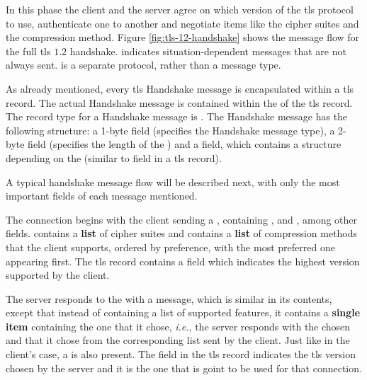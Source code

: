 \documentclass{llncs}
\begin{document}
In this phase the client and the server agree on which version of the \gls{tls}
protocol to use, authenticate one to another and negotiate items like
the cipher suites and the compression method. Figure \ref{fig:tls-12-handshake} shows the message flow for the
full \gls{tls} $1.2$ handshake. \codeword{*} indicates situation-dependent
messages that are not always sent.  is a separate
protocol, rather than a message type.

As already mentioned, every \gls{tls} Handshake message is encapsulated within
a \gls{tls} record. The actual Handshake message is contained within the
 of the \gls{tls} record. The record type for a Handshake
message is . The Handshake message has the following structure:
a 1-byte  field (specifies the Handshake message type),
a 2-byte  field (specifies the length of the )
and a  field, which contains a structure depending on the
 (similar to  field in a \gls{tls} record).

A typical handshake message flow will be described next, with only the most important fields of each message mentioned.

The connection begins with the client sending a , containing ,  and ,
among other fields.
 contains a \textbf{list} of cipher suites and 
contains a \textbf{list} of compression methods that the
client supports, ordered by preference, with the most preferred one appearing first.
The \gls{tls} record contains a   field which
indicates the highest version supported by the client.

The server responds to the  with a 
message, which is similar in its contents, except that instead of containing
a list of supported features, it contains a \textbf{single item} containing the one that it chose,
\textit{i.e.}, the server responds with the chosen  and
 that it chose from the
corresponding list sent by the client. Just like in the client's case, a 
is also present. The  field in the \gls{tls} record indicates
the \gls{tls} version chosen by the server and it is the one that is goint to be
used for that connection.
\end{document}
